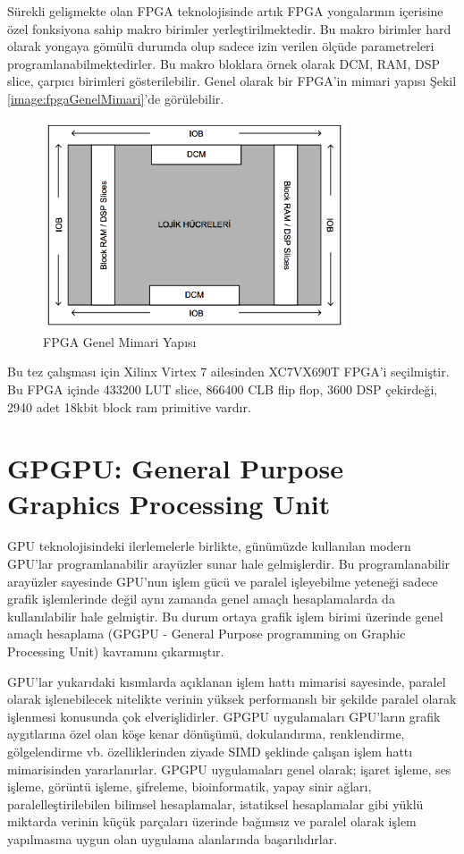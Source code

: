 Sürekli gelişmekte olan FPGA teknolojisinde artık FPGA yongalarının içerisine özel fonksiyona sahip makro birimler yerleştirilmektedir. Bu makro birimler hard olarak yongaya gömülü durumda olup sadece izin verilen ölçüde parametreleri programlanabilmektedirler. Bu makro bloklara örnek olarak DCM, RAM, DSP slice, çarpıcı birimleri gösterilebilir. Genel olarak bir FPGA’in mimari yapısı Şekil \ref{image:fpgaGenelMimari}’de görülebilir.
\begin{figure}[h]
\centering
\shorthandoff{=}
\includegraphics[width=0.8\textwidth]{gorsel/fpgaGenelMimari.png}
\shorthandoff{=}
\caption{FPGA Genel Mimari Yapısı}
\label{fpgaGenelMimari}
\end{figure}
Bu tez çalışması için Xilinx Virtex 7 ailesinden XC7VX690T FPGA’i seçilmiştir. Bu FPGA içinde 433200 LUT slice, 866400 CLB flip flop, 3600 DSP çekirdeği, 2940 adet 18kbit block ram primitive vardır. \par

\section{GPGPU: General Purpose Graphics Processing Unit}

GPU teknolojisindeki ilerlemelerle birlikte, günümüzde kullanılan modern GPU’lar programlanabilir arayüzler sunar hale gelmişlerdir. Bu programlanabilir arayüzler sayesinde GPU’nun işlem gücü ve paralel işleyebilme yeteneği sadece grafik işlemlerinde değil aynı zamanda genel amaçlı hesaplamalarda da kullanılabilir hale gelmiştir. Bu durum ortaya grafik işlem birimi üzerinde genel amaçlı hesaplama (GPGPU - General Purpose programming on Graphic Processing Unit) kavramını çıkarmıştır. \par
GPU’lar yukarıdaki kısımlarda açıklanan işlem hattı mimarisi sayesinde, paralel olarak işlenebilecek nitelikte verinin yüksek performanslı bir şekilde paralel olarak işlenmesi konusunda çok elverişlidirler. GPGPU uygulamaları GPU’ların grafik aygıtlarına özel olan köşe kenar dönüşümü, dokulandırma, renklendirme, gölgelendirme vb. özelliklerinden ziyade SIMD şeklinde çalışan işlem hattı mimarisinden yararlanırlar. GPGPU uygulamaları genel olarak; işaret işleme, ses işleme, görüntü işleme, şifreleme, bioinformatik, yapay sinir ağları, paralelleştirilebilen bilimsel hesaplamalar, istatiksel hesaplamalar gibi yüklü miktarda verinin küçük parçaları üzerinde bağımsız ve paralel olarak işlem yapılmasına uygun olan uygulama alanlarında başarılıdırlar. \cite{ertanYildizThesis}\par

